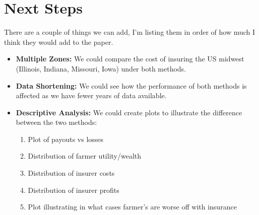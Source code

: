 \documentclass[11pt]{article}
\begin{document}
  \FloatBarrier

\section{Next Steps}
  There are a couple of things we can add, I'm listing them in order of how much I think they would add to the paper. 
\begin{itemize}
  \item \textbf{Multiple Zones:} We could compare the cost of insuring the US midwest (Illinois, Indiana, Missouri, Iowa) under both methods. 
  \item \textbf{Data Shortening:} We could see how the performance of both methods is affected as we have fewer years of data available. 
  \item \textbf{Descriptive Analysis:} We could create plots to illustrate the difference between the two methods: 
    \begin{enumerate}
      \item Plot of payouts vs losses
      \item Distribution of farmer utility/wealth
      \item Distribution of insurer costs
      \item Distribution of insurer profits
      \item Plot illustrating in what cases farmer's are worse off with insurance
    \end{enumerate}
\end{itemize}
  
   
\end{document}

